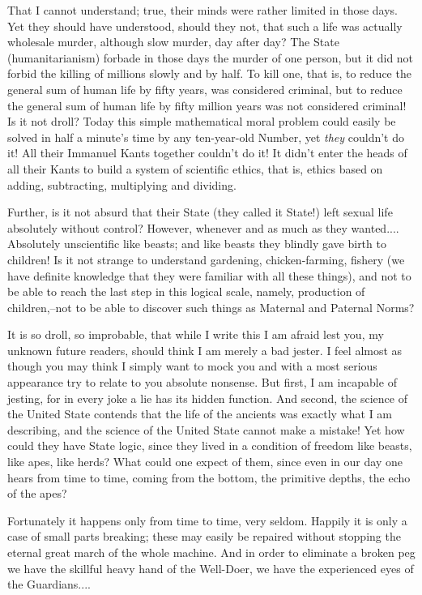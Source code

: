 \documentclass[11pt,openany]{book}
\begin{document}
That I cannot understand; true, their minds were rather limited in those days. Yet they should have understood, should they not, that such a life was actually wholesale murder, although slow murder, day after day? The State (humanitarianism) forbade in those days the murder of one person, but it did not forbid the killing of millions slowly and by half. To kill one, that is, to reduce the general sum of human life by fifty years, was considered criminal, but to reduce the general sum of human life by fifty million years was not considered criminal! Is it not droll? Today this simple mathematical moral problem could easily be solved in half a minute's time by any ten-year-old Number, yet \emph{they} couldn't do it! All their Immanuel Kants together couldn't do it! It didn't enter the heads of all their Kants to build a system of scientific ethics, that is, ethics based on adding, subtracting, multiplying and dividing.

Further, is it not absurd that their State (they called it State!) left sexual life absolutely without control? However, whenever and as much as they wanted.... Absolutely unscientific like beasts; and like beasts they blindly gave birth to children! Is it not strange to understand gardening, chicken-farming, fishery (we have definite knowledge that they were familiar with all these things), and not to be able to reach the last step in this logical scale, namely, production of children,--not to be able to discover such things as Maternal and Paternal Norms?

It is so droll, so improbable, that while I write this I am afraid lest you, my unknown future readers, should think I am merely a bad jester. I feel almost as though you may think I simply want to mock you and with a most serious appearance try to relate to you absolute nonsense. But first, I am incapable of jesting, for in every joke a lie has its hidden function. And second, the science of the United State contends that the life of the ancients was exactly what I am describing, and the science of the United State cannot make a mistake! Yet how could they have State logic, since they lived in a condition of freedom like beasts, like apes, like herds? What could one expect of them, since even in our day one hears from time to time, coming from the bottom, the primitive depths, the echo of the apes?

Fortunately it happens only from time to time, very seldom. Happily it is only a case of small parts breaking; these may easily be repaired without stopping the eternal great march of the whole machine. And in order to eliminate a broken peg we have the skillful heavy hand of the Well-Doer, we have the experienced eyes of the Guardians....
\end{document}
